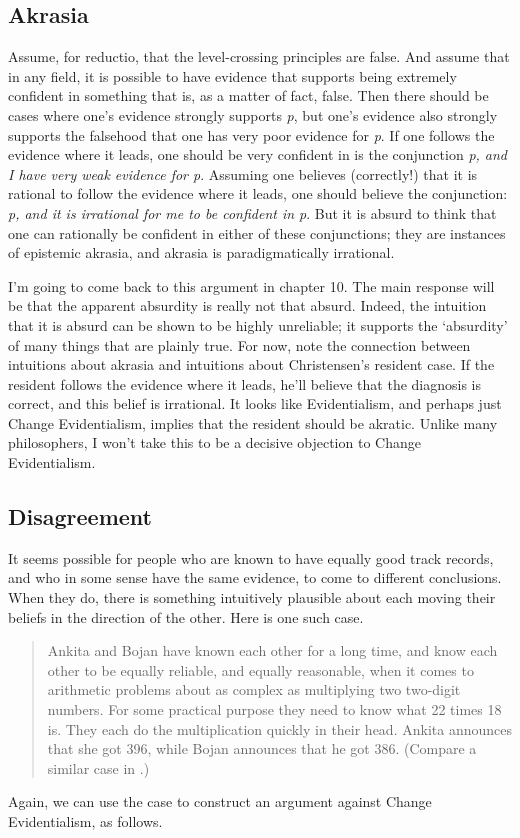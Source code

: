 \subsection{Akrasia}
\label{akrasia}

Assume, for reductio, that the level-crossing principles are false. And assume that in any field, it is possible to have evidence that supports being extremely confident in something that is, as a matter of fact, false. Then there should be cases where one's evidence strongly supports \emph{p}, but one's evidence also strongly supports the falsehood that one has very poor evidence for \emph{p}. If one follows the evidence where it leads, one should be very confident in is the conjunction \emph{p, and I have very weak evidence for p}. Assuming one believes (correctly!) that it is rational to follow the evidence where it leads, one should believe the conjunction: \emph{p, and it is irrational for me to be confident in p}. But it is absurd to think that one can rationally be confident in either of these conjunctions; they are instances of epistemic akrasia, and akrasia is paradigmatically irrational.

I'm going to come back to this argument in chapter 10. The main response will be that the apparent absurdity is really not that absurd. Indeed, the intuition that it is absurd can be shown to be highly unreliable; it supports the `absurdity' of many things that are plainly true. For now, note the connection between intuitions about akrasia and intuitions about Christensen's resident case. If the resident follows the evidence where it leads, he'll believe that the diagnosis is correct, and this belief is irrational. It looks like Evidentialism, and perhaps just Change Evidentialism, implies that the resident should be akratic. Unlike many philosophers, I won't take this to be a decisive objection to Change Evidentialism.

\subsection{Disagreement}
\label{disagreement}

It seems possible for people who are known to have equally good track records, and who in some sense have the same evidence, to come to different conclusions. When they do, there is something intuitively plausible about each moving their beliefs in the direction of the other. Here is one such case.

\begin{quote}
\gls{Ankita} and \gls{Bojan} have known each other for a long time, and know each other to be equally reliable, and equally reasonable, when it comes to arithmetic problems about as complex as multiplying two two-digit numbers. For some practical purpose they need to know what 22 times 18 is. They each do the multiplication quickly in their head. \gls{Ankita} announces that she got 396, while \gls{Bojan} announces that he got 386. (Compare a similar case in \citet[193]{Christensen2007c}.)
\end{quote}
Again, we can use the case to construct an argument against Change Evidentialism, as follows.

